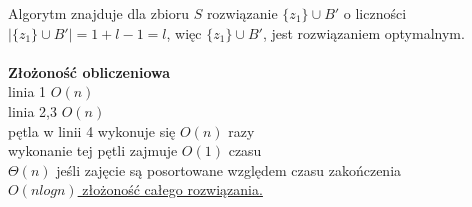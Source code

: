Algorytm znajduje dla zbioru $S$ rozwiązanie $\lbrace z_1 \rbrace \cup B'$ o liczności $\vert \lbrace z_1 \rbrace \cup B' \vert = 1 + l - 1 = l$, więc $\lbrace z_1 \rbrace \cup B'$, jest rozwiązaniem optymalnym.\\
\\
\textbf{Złożoność obliczeniowa}\\
linia 1 \tab $O(n)$\\
linia 2,3 \tab $O(n)$\\
pętla w linii 4 wykonuje się $O(n)$ razy\\
\tab wykonanie tej pętli zajmuje $O(1)$ czasu\\
$\Theta(n)$ jeśli zajęcie są posortowane względem czasu zakończenia \\
\underline{$O(nlogn)$ złożoność całego rozwiązania.}


